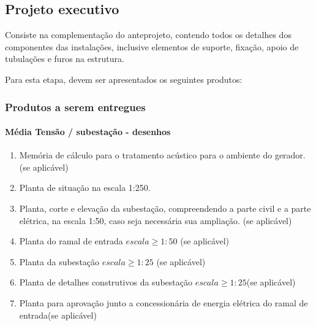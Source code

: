 \subsection{Projeto executivo} \label{subsection: etapa-PE}

Consiste na complementação do anteprojeto, contendo todos os detalhes dos componentes das instalações, inclusive elementos de suporte, fixação, apoio de tubulações e furos na estrutura.

Para esta etapa, devem ser apresentados os seguintes produtos:

\subsubsection{Produtos a serem entregues}

\paragraph{Média Tensão / subestação - desenhos}

	\begin{enumerate}
			\item Memória de cálculo para o tratamento acústico para o ambiente do gerador. (se aplicável)
		
		\item Planta de situação na escala 1:250.
		
		\item Planta, corte e elevação da subestação, compreendendo a parte civil e a parte elétrica, na escala 1:50, caso seja necessária sua ampliação. (se aplicável)
		
		\item Planta do ramal de entrada $escala \geq 1:50$ (se aplicável)
		
		\item Planta da subestação $escala \geq 1:25$ (se aplicável)
		
		\item Planta de detalhes construtivos da subestação $escala \geq 1:25$(se aplicável)
		
		\item Planta para aprovação junto a concessionária de energia elétrica do ramal de entrada(se aplicável)
	\end{enumerate}

